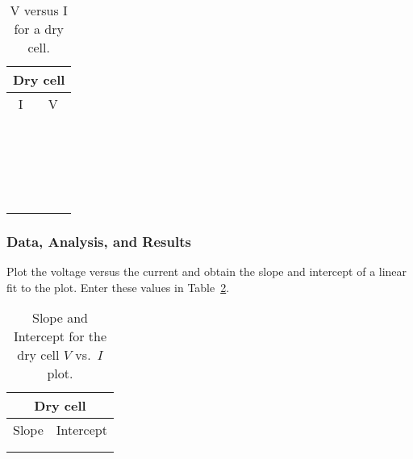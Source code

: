 \begin{table}[htb]
\begin{center}
\begin{tabular}{|c|c|}
\hline
\multicolumn{2}{|c|}{Dry cell}\\
\hline
I & V \\
\hline
\hspace*{5cm} & \hspace*{5cm} \\
& \\
\hline
& \\
& \\
\hline
& \\
& \\
\hline
& \\
& \\
\hline
& \\
& \\
\hline
& \\
& \\
\hline
& \\
& \\
\hline
& \\
& \\
\hline
& \\
& \\
\hline
& \\
& \\
\hline
\end{tabular}
\end{center}
\caption{V versus I for a dry cell.}
\label{tab:DC:intres}
\end{table}
\clearpage

\subsubsection{Data, Analysis, and Results}

Plot the voltage versus the current and obtain the slope and intercept of a
linear fit to the plot.  Enter these values in Table~\ref{tab:DC:battslope}.

\begin{table}[htb]
\begin{center}
\begin{tabular}{|c|c|}
\hline
\multicolumn{2}{|c|}{Dry cell} \\
\hline
Slope & Intercept \\
\hline
\hspace*{5cm} & \hspace*{5cm} \\
& \\
\hline
\end{tabular}
\end{center}
\caption{Slope and Intercept for the dry cell $V$ vs.\ $I$ plot.}
\label{tab:DC:battslope}
\end{table}








